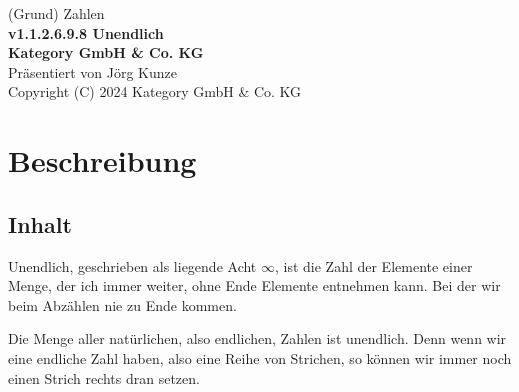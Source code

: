 \documentclass[a4paper]{amsart}
\theoremstyle{definition}
\begin{document}
\begin{titlepage}
\centering
{\huge
(Grund) Zahlen\\[1cm]
\textbf{v1.1.2.6.9.8 Unendlich}
}\\[1cm]

\textbf{Kategory GmbH \& Co. KG}\\
Präsentiert von Jörg Kunze\\
Copyright (C) 2024 Kategory GmbH \& Co. KG

\end{titlepage}

%

\newpage

\section*{Beschreibung}

\subsection*{Inhalt}
Unendlich, geschrieben als liegende Acht $\infty$, ist die Zahl der Elemente einer Menge, der ich immer weiter, ohne Ende Elemente entnehmen kann. Bei der wir beim Abzählen nie zu Ende kommen.

Die Menge aller natürlichen, also endlichen, Zahlen ist unendlich. Denn wenn wir eine endliche Zahl haben, also eine Reihe von Strichen, so können wir immer noch einen Strich rechts dran setzen.
\end{document}
